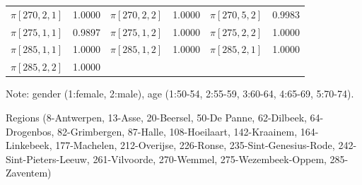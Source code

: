 \documentclass[12pt]{article}
\begin{document}
\begin{table}[h!]
\begin{threeparttable}
\begin{tabular}{cc|cc|cc}
        $\pi[270,2,1]$ & 1.0000 & $\pi[270,2,2]$ & 1.0000 & $\pi[270,5,2]$ & 0.9983 \\ 
        $\pi[275,1,1]$ & 0.9897 & $\pi[275,1,2]$ & 1.0000 & $\pi[275,2,2]$ & 1.0000 \\ 
        $\pi[285,1,1]$ & 1.0000 & $\pi[285,1,2]$ & 1.0000 & $\pi[285,2,1]$ & 1.0000 \\ 
        $\pi[285,2,2]$ & 1.0000 & & & & \\ \hline
        \end{tabular}
        \begin{tablenotes}
          \centering
          \tiny
          \item Note: gender (1:female, 2:male), age (1:50-54, 2:55-59, 3:60-64, 4:65-69, 5:70-74). 
          \item  Regions (8-Antwerpen, 13-Asse, 20-Beersel, 50-De Panne, 62-Dilbeek, 64-Drogenbos, 82-Grimbergen, 87-Halle, 108-Hoeilaart, 142-Kraainem, 164-Linkebeek, 177-Machelen, 212-Overijse, 226-Ronse, 235-Sint-Genesius-Rode, 242-Sint-Pieters-Leeuw, 261-Vilvoorde, 270-Wemmel, 275-Wezembeek-Oppem, 285-Zaventem)
        \end{tablenotes}
    \end{threeparttable}
\end{table}
\FloatBarrier


    



\end{document}
